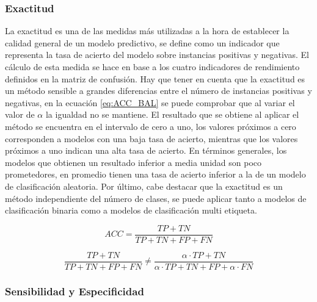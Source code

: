 \subsubsection{Exactitud}

La exactitud \cite{tharwat_2018} es una de las medidas más utilizadas a la hora de establecer la calidad general de un modelo predictivo, se define como un indicador que representa la tasa de acierto del modelo sobre instancias positivas y negativas. El cálculo de esta medida se hace en base a los cuatro indicadores de rendimiento definidos en la matriz de confusión. Hay que tener en cuenta que la exactitud es un método sensible a grandes diferencias entre el número de instancias positivas y negativas, en la ecuación \ref{eq:ACC_BAL} se puede comprobar que al variar el valor de $\alpha$ la igualdad no se mantiene. El resultado que se obtiene al aplicar el método se encuentra en el intervalo de cero a uno, los valores próximos a cero corresponden a modelos con una baja tasa de acierto, mientras que los valores próximos a uno indican una alta tasa de acierto. En términos generales, los modelos que obtienen un resultado inferior a media unidad son poco prometedores, en promedio tienen una tasa de acierto inferior a la de un modelo de clasificación aleatoria. Por último, cabe destacar que la exactitud es un método independiente del número de clases, se puede aplicar tanto a modelos de clasificación binaria como a modelos de clasificación multi etiqueta.

\bigbreak

\begin{equation}
    ACC = \frac{TP+TN}{TP+TN+FP+FN}
    \label{eq:ACC}  
\end{equation}

\bigbreak

\begin{equation}
    \frac{TP+TN}{TP+TN+FP+FN}\neq \frac{ \alpha \cdot TP+TN}{\alpha \cdot TP+TN+FP+ \alpha \cdot FN}
    \label{eq:ACC_BAL}  
\end{equation}



\subsubsection{Sensibilidad y Especificidad}

